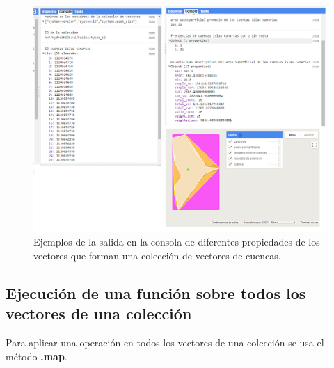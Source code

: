 \documentclass[
  12pt,
  letterpaper,
  twoside]{book}
\newcommand\boldpurple[1]{\textcolor{darkpurple}{\textbf{#1}}}
\begin{document}
\begin{figure}[H]

{\centering \includegraphics[width=0.95\linewidth]{Img/ej20} 

}

\caption{Ejemplos de la salida en la consola de diferentes propiedades de los vectores que forman una colección de vectores de cuencas.}\label{fig:f88}
\end{figure}

\hypertarget{ejecuciuxf3n-de-una-funciuxf3n-sobre-todos-los-vectores-de-una-colecciuxf3n}{%
\subsection*{Ejecución de una función sobre todos los vectores de una colección}\label{ejecuciuxf3n-de-una-funciuxf3n-sobre-todos-los-vectores-de-una-colecciuxf3n}}

Para aplicar una operación en todos los vectores de una colección se usa el método \boldpurple{.map}.
\end{document}
